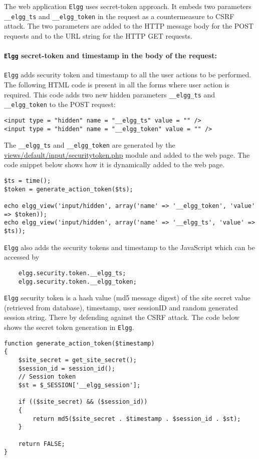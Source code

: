 The web application {\tt Elgg} uses secret-token approach. 
It embeds two parameters {\tt\_\_elgg\_ts} and {\tt\_\_elgg\_token} in the request as a countermeasure to CSRF attack. 
The two parameters are added to the HTTP message body for the POST requests and to the URL string for the HTTP GET requests.

\paragraph{{\tt Elgg} secret-token and timestamp in the body of the request:}


{\tt Elgg} adds security token and timestamp to all the user actions to be performed.
The following HTML code is present in all the forms where user action is required. 
This code adds two new hidden parameters {\tt\_\_elgg\_ts} and {\tt\_\_elgg\_token} to the POST request:

\begin{Verbatim}[frame=single]
<input type = "hidden" name = "__elgg_ts" value = "" />
<input type = "hidden" name = "__elgg_token" value = "" />
\end{Verbatim}

The {\tt\_\_elgg\_ts} and {\tt\_\_elgg\_token} are generated by the 
\url{views/default/input/securitytoken.php} 
module and added to the web page. 
The code snippet below shows how it is dynamically added to the web page.
{\footnotesize
\begin{Verbatim}[frame=single]
$ts = time();
$token = generate_action_token($ts);

echo elgg_view('input/hidden', array('name' => '__elgg_token', 'value' => $token));
echo elgg_view('input/hidden', array('name' => '__elgg_ts', 'value' => $ts));
\end{Verbatim}
}

{\tt Elgg} also adds the security tokens and timestamp to the JavaScript which can be accessed by 

	\begin{verbatim}
	elgg.security.token.__elgg_ts;
	elgg.security.token.__elgg_token;
	\end{verbatim}

{\tt Elgg} security token is a hash value (md5 message digest) of the site secret value (retrieved from database),
timestamp, user sessionID and random generated session string. There by defending against the CSRF attack.  
The code below shows the secret token generation in {\tt Elgg}.


{\footnotesize
\begin{Verbatim}[frame=single]
function generate_action_token($timestamp) 
{
	$site_secret = get_site_secret();
	$session_id = session_id();
	// Session token
	$st = $_SESSION['__elgg_session'];

	if (($site_secret) && ($session_id)) 
	{
		return md5($site_secret . $timestamp . $session_id . $st);
	}

	return FALSE;
}
\end{Verbatim}
}


